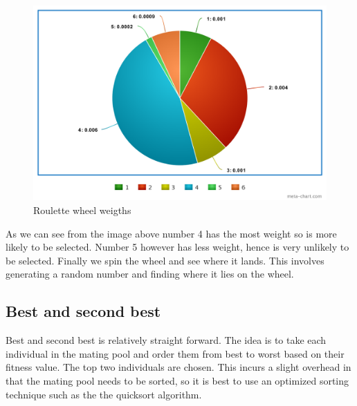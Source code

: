 \begin{figure}[h!]
\vspace{-5pt}
\centering
\includegraphics[width=1.0\textwidth]{images/roulette-wheel-2.png}
\caption{\label{fig:3col_graph}Roulette wheel weigths}
\end{figure}

As we can see from the image above number 4 has the most weight so is more likely to be selected. Number 5 however has less weight, hence is very unlikely to be selected. Finally we spin the wheel and see where it lands. This involves generating a random number and finding where it lies on the wheel.

\subsection{Best and second best}

Best and second best is relatively straight forward. The idea is to take each individual in the mating pool and order them from best to worst based on their fitness value. The top two individuals are chosen. This incurs a slight overhead in that the mating pool needs to be sorted, so it is best to use an optimized sorting technique such as the the quicksort algorithm.